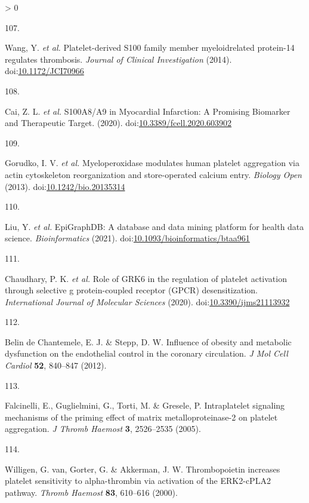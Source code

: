 \documentclass[11pt,twoside]{bristolthesis}
\newlength{\cslhangindent}
\newlength{\csllabelwidth}
\newenvironment{CSLReferences}[2] %
 {%
  \setlength{\parindent}{0pt}
  \ifodd #1 \everypar{\setlength{\hangindent}{\cslhangindent}}\ignorespaces\fi
  \ifnum #2 > 0
  \setlength{\parskip}{#2\baselineskip}
  \fi
 }%
 {}
\newcommand{\CSLLeftMargin}[1]{\parbox[t]{\csllabelwidth}{#1}}
\newcommand{\CSLRightInline}[1]{\parbox[t]{\linewidth - \csllabelwidth}{#1}\break}
\begin{document}
\begin{CSLReferences}{0}{0}
\leavevmode\hypertarget{ref-Wang2014a}{}%
\CSLLeftMargin{107. }
\CSLRightInline{Wang, Y. \emph{et al.} {Platelet-derived S100 family member myeloidrelated protein-14 regulates thrombosis}. \emph{Journal of Clinical Investigation} (2014). doi:\href{https://doi.org/10.1172/JCI70966}{10.1172/JCI70966}}

\leavevmode\hypertarget{ref-Cai2020}{}%
\CSLLeftMargin{108. }
\CSLRightInline{Cai, Z. L. \emph{et al.} {S100A8/A9 in Myocardial Infarction: A Promising Biomarker and Therapeutic Target}. (2020). doi:\href{https://doi.org/10.3389/fcell.2020.603902}{10.3389/fcell.2020.603902}}

\leavevmode\hypertarget{ref-Gorudko2013}{}%
\CSLLeftMargin{109. }
\CSLRightInline{Gorudko, I. V. \emph{et al.} {Myeloperoxidase modulates human platelet aggregation via actin cytoskeleton reorganization and store-operated calcium entry}. \emph{Biology Open} (2013). doi:\href{https://doi.org/10.1242/bio.20135314}{10.1242/bio.20135314}}

\leavevmode\hypertarget{ref-Liu2021}{}%
\CSLLeftMargin{110. }
\CSLRightInline{Liu, Y. \emph{et al.} {EpiGraphDB: A database and data mining platform for health data science}. \emph{Bioinformatics} (2021). doi:\href{https://doi.org/10.1093/bioinformatics/btaa961}{10.1093/bioinformatics/btaa961}}

\leavevmode\hypertarget{ref-Chaudhary2020}{}%
\CSLLeftMargin{111. }
\CSLRightInline{Chaudhary, P. K. \emph{et al.} {Role of GRK6 in the regulation of platelet activation through selective g protein-coupled receptor (GPCR) desensitization}. \emph{International Journal of Molecular Sciences} (2020). doi:\href{https://doi.org/10.3390/ijms21113932}{10.3390/ijms21113932}}

\leavevmode\hypertarget{ref-BelindeChantemele2012a}{}%
\CSLLeftMargin{112. }
\CSLRightInline{Belin de Chantemele, E. J. \& Stepp, D. W. {Influence of obesity and metabolic dysfunction on the endothelial control in the coronary circulation}. \emph{J Mol Cell Cardiol} \textbf{52}, 840--847 (2012).}

\leavevmode\hypertarget{ref-Falcinelli2005}{}%
\CSLLeftMargin{113. }
\CSLRightInline{Falcinelli, E., Guglielmini, G., Torti, M. \& Gresele, P. {Intraplatelet signaling mechanisms of the priming effect of matrix metalloproteinase-2 on platelet aggregation}. \emph{J Thromb Haemost} \textbf{3}, 2526--2535 (2005).}

\leavevmode\hypertarget{ref-VanWilligen2000}{}%
\CSLLeftMargin{114. }
\CSLRightInline{Willigen, G. van, Gorter, G. \& Akkerman, J. W. {Thrombopoietin increases platelet sensitivity to alpha-thrombin via activation of the ERK2-cPLA2 pathway}. \emph{Thromb Haemost} \textbf{83}, 610--616 (2000).}


\end{CSLReferences}
\end{document}
